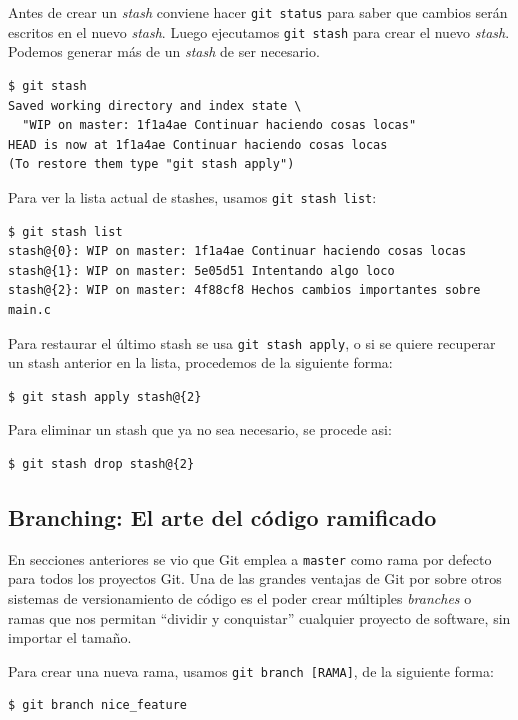 \documentclass{article}
\begin{document}
Antes de crear un \textit{stash} conviene hacer \texttt{git status} para saber que cambios serán escritos en el nuevo \textit{stash}. Luego ejecutamos \texttt{git stash} para crear el nuevo \textit{stash}. Podemos generar más de un \textit{stash} de ser necesario.

\begin{verbatim}
$ git stash
Saved working directory and index state \
  "WIP on master: 1f1a4ae Continuar haciendo cosas locas"
HEAD is now at 1f1a4ae Continuar haciendo cosas locas
(To restore them type "git stash apply")
\end{verbatim}

Para ver la lista actual de stashes, usamos \texttt{git stash list}:
\begin{verbatim}
$ git stash list
stash@{0}: WIP on master: 1f1a4ae Continuar haciendo cosas locas
stash@{1}: WIP on master: 5e05d51 Intentando algo loco
stash@{2}: WIP on master: 4f88cf8 Hechos cambios importantes sobre main.c
\end{verbatim}

Para restaurar el último stash se usa \texttt{git stash apply}, o si se quiere recuperar un stash anterior en la lista, procedemos de la siguiente forma:
\begin{verbatim}
$ git stash apply stash@{2}
\end{verbatim}

Para eliminar un stash que ya no sea necesario, se procede asi:
\begin{verbatim}
$ git stash drop stash@{2}
\end{verbatim}

\pagebreak

\subsection{Branching: El arte del código ramificado}\label{branch}

En secciones anteriores se vio que Git emplea a \texttt{master} como rama por defecto para todos los proyectos Git. Una de las grandes ventajas de Git por sobre otros sistemas de versionamiento de código es el poder crear múltiples \textit{branches} o ramas que nos permitan ``dividir y conquistar'' cualquier proyecto de software, sin importar el tamaño.


Para crear una nueva rama, usamos \texttt{git branch [RAMA]}, de la siguiente forma:
\begin{verbatim}
$ git branch nice_feature
\end{verbatim}
\end{document}
